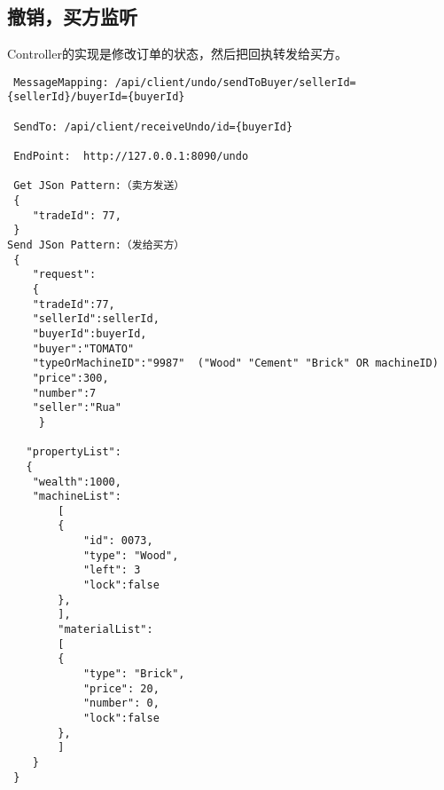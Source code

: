 \documentclass{article}
\begin{document}
				\subsection{撤销，买方监听}

                Controller的实现是修改订单的状态，然后把回执转发给买方。
                
\begin{lstlisting}
 MessageMapping: /api/client/undo/sendToBuyer/sellerId={sellerId}/buyerId={buyerId}

 SendTo: /api/client/receiveUndo/id={buyerId}

 EndPoint:  http://127.0.0.1:8090/undo

 Get JSon Pattern:（卖方发送）
 {
    "tradeId": 77,
 }
Send JSon Pattern:（发给买方）
 {
    "request":
    {
    "tradeId":77,
    "sellerId":sellerId,
    "buyerId":buyerId,
    "buyer":"TOMATO"
    "typeOrMachineID":"9987"  ("Wood" "Cement" "Brick" OR machineID)
    "price":300,
    "number":7
    "seller":"Rua"
     }

   "propertyList":
   {
   	"wealth":1000,
   	"machineList":
    	[
        {
            "id": 0073,
            "type": "Wood",
            "left": 3
            "lock":false
        },
    	],
    	"materialList":
    	[
        {
            "type": "Brick",
            "price": 20,
            "number": 0,
            "lock":false
        },
    	]
    }
 }

\end{lstlisting}
\end{document}
